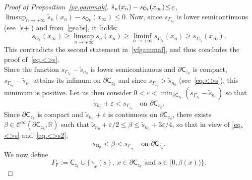 \documentclass[10pt]{amsart}
\let\pa\partial
\let\ve\varepsilon
\theoremstyle{plain}
\theoremstyle{definition}
\begin{document}
\begin{proof}[Proof of Proposition~\ref{pr.gammak}]
\hbox{$ \tilde s_{n}(x_n)-\nobreak s_{\mathsf O_{\mathsf F}}(x_{\infty})\!\le\! \ve$}, \ie $\limsup_{n\to +\infty} \tilde s_{n}(x_n)- s_{\mathsf O_{\mathsf F}}(x_{\infty})\le 0$. Now, since $s_{\Gamma_{z_k}}$ is lower semicontinuous (see~\eqref{s+}) and from~\eqref{geabs}, it~holds:
\[
s_{\mathsf O_{\mathsf F}}(x_{\infty})\ge \limsup_{n\to +\infty} \tilde s_{n}(x_n) \ge \liminf_{n\to +\infty} s_{\Gamma_{z_k}}(x_n)\ge s_{\Gamma_{z_k}}(x_\infty).
\]
This contradicts the second statement in~\eqref{vfgammaf}, and thus concludes the proof of~\eqref{eq.<>s}. \\
Since the function $s_{\Gamma_{z_k}}-\tilde s_{n_0}$ is lower semicontinuous and $\pa \mathsf C_{z_k}$ is compact, $s_{\Gamma_{z_k}}-\tilde s_{n_0}$ attains its infimum on $\pa \mathsf C_{z_k}$ and since $ s_{\Gamma_{z_k}}>\tilde s_{n_0}$ (see~\eqref{eq.<>s}), this minimum is positive. Let us then consider $0<\ve<\min_{\pa \mathsf C_{z_k}} (s_{\Gamma_{z_k}}-\tilde s_{n_0})$ so that
\begin{equation}\label{eq.<>s2}
\tilde s_{n_0} +\ve < s_{\Gamma_{z_k}} \quad \text{on } \pa \mathsf C_{z_k}.
\end{equation}
Since
$ \pa \mathsf C_{z_k}$ is compact and $ \tilde s_{n_0} +\ve$ is continuous on $ \pa \mathsf C_{z_k}$, there exists $\beta \in \mathcal C^\infty(\pa \mathsf C_{z_k},\mathbb R)$ such that $ \tilde s_{n_0} +\ve /2\le \beta \le \tilde s_{n_0} + {3\ve}/{4}$, so that in view of \eqref{eq.<>s} and~\eqref{eq.<>s2},
\begin{equation}\label{eq.betas}
s_{\mathsf O_{\mathsf F}} < \beta <s_{\Gamma_{z_k}} \quad \text{on } \pa \mathsf C_{z_k}.
\end{equation}
We now define
\begin{equation}\label{F}
\Gamma_{\mathsf F}:= \mathsf C_{z_k} \cup \big \{ \gamma_x(s), \, x\in \pa \mathsf C_{z_k} \text{ and } s\in [0,\beta(x))\big \}.
\end{equation}


\end{proof}
\end{document}
